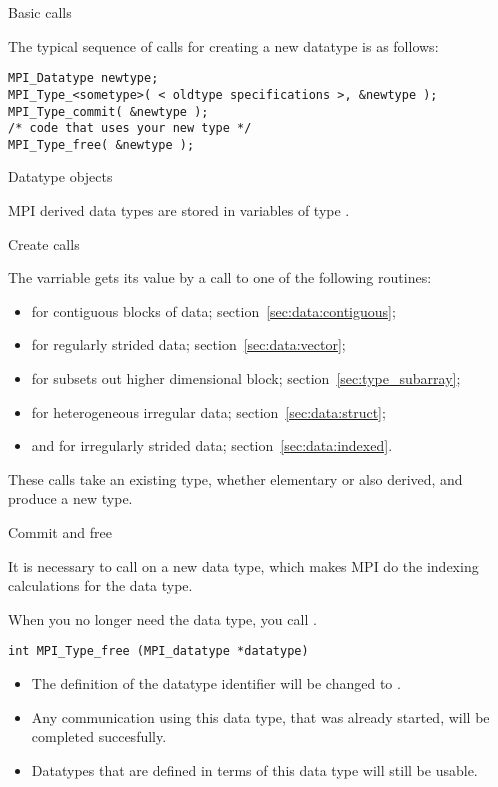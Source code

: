  {Basic calls}
\label{sec:data-commit}

The typical sequence of calls for creating a new datatype is as follows:
\begin{verbatim}
MPI_Datatype newtype;
MPI_Type_<sometype>( < oldtype specifications >, &newtype );
MPI_Type_commit( &newtype );
/* code that uses your new type */
MPI_Type_free( &newtype );
\end{verbatim}

 {Datatype objects}

MPI derived data types are stored in variables of type
.

 {Create calls}

The  varriable gets its value by a call to
one of the following routines:
\begin{itemize}
\item {} for contiguous blocks of
  data; section~\ref{sec:data:contiguous};
\item {} for regularly strided data;
  section~\ref{sec:data:vector};
\item {} for subsets out higher
  dimensional block; section~\ref{sec:type_subarray};
\item {} for heterogeneous irregular data;
  section~\ref{sec:data:struct};
\item {} and
   for irregularly strided data;
  section~\ref{sec:data:indexed}.
\end{itemize}
These calls take an existing type, whether elementary or also derived,
and produce a new type.

 {Commit and free}

It is necessary to call  on a new data
type, which makes MPI do the indexing calculations for the data type.
%

When you no longer
need the data type, you call .
\begin{verbatim}
int MPI_Type_free (MPI_datatype *datatype)
\end{verbatim}
\begin{itemize}
\item The definition of the datatype identifier will be changed to
  .
\item Any communication using this data type, that was already
  started, will be completed succesfully.
\item Datatypes that are defined in terms of this data type will still
  be usable.
\end{itemize}

